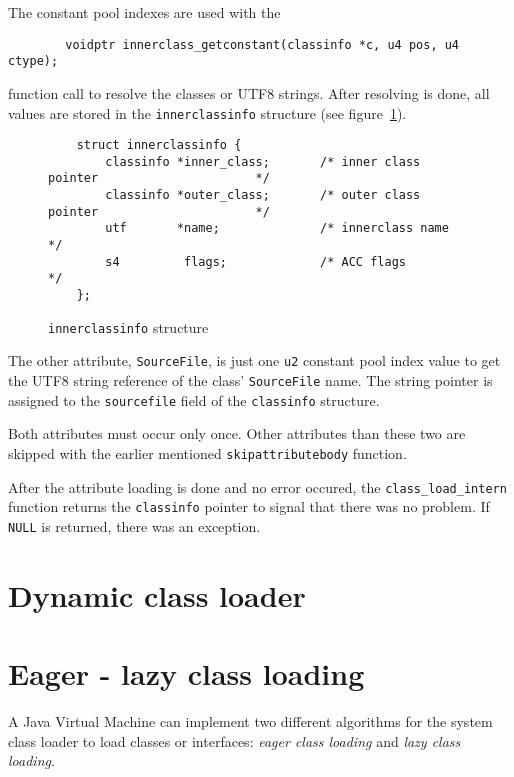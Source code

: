 The constant pool indexes are used with the

\begin{verbatim}
        voidptr innerclass_getconstant(classinfo *c, u4 pos, u4 ctype);
\end{verbatim}

function call to resolve the classes or UTF8 strings. After resolving
is done, all values are stored in the \texttt{innerclassinfo}
structure (see figure~\ref{innerclassinfostructure}).

\begin{figure}[h]
\begin{verbatim}
    struct innerclassinfo {
        classinfo *inner_class;       /* inner class pointer                      */
        classinfo *outer_class;       /* outer class pointer                      */
        utf       *name;              /* innerclass name                          */
        s4         flags;             /* ACC flags                                */
    };
\end{verbatim}
\caption{\texttt{innerclassinfo} structure}
\label{innerclassinfostructure}
\end{figure}

The other attribute, \texttt{SourceFile}, is just one \texttt{u2}
constant pool index value to get the UTF8 string reference of the
class' \texttt{SourceFile} name. The string pointer is assigned to the
\texttt{sourcefile} field of the \texttt{classinfo} structure.

Both attributes must occur only once. Other attributes than these two
are skipped with the earlier mentioned \texttt{skipattributebody}
function.

After the attribute loading is done and no error occured, the
\texttt{class\_load\_intern} function returns the \texttt{classinfo}
pointer to signal that there was no problem. If \texttt{NULL} is
returned, there was an exception.


\section{Dynamic class loader}


\section{Eager - lazy class loading}

A Java Virtual Machine can implement two different algorithms for the
system class loader to load classes or interfaces: \textit{eager class
loading} and \textit{lazy class loading}.


